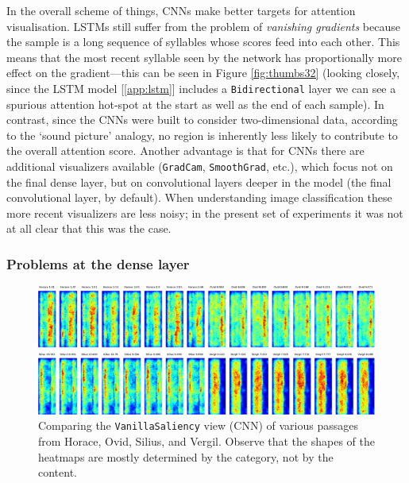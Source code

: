 \documentclass[
    twocolumn,
    hf,
]{ceurart}
\begin{document}
In the overall scheme of things, CNNs make better targets for attention
visualisation. LSTMs still suffer from the problem of \emph{vanishing gradients}
because the sample is a long sequence of syllables whose scores feed into each
other. This means that the most recent syllable seen by the network has
proportionally more effect on the gradient---this can be seen in Figure
\ref{fig:thumbs32} (looking closely, since the LSTM
model [\ref{app:lstm}] includes a \texttt{Bidirectional} layer we
can see a spurious attention hot-spot at the start as well as the end of each
sample). In contrast, since the CNNs were built to consider two-dimensional
data, according to the `sound picture' analogy, no region is inherently less
likely to contribute to the overall attention score. Another advantage is that
for CNNs there are additional visualizers available
(\texttt{GradCam}, \texttt{SmoothGrad}, etc.), which
focus not on the final dense layer, but on convolutional layers deeper in the
model (the final convolutional layer, by default). When understanding image
classification these more recent visualizers are less noisy; in the present set
of experiments it was not at all clear that this was the case.

\subsubsection{Problems at the dense layer}

\begin{figure}
    \includegraphics[width=\textwidth]{figures/hosv-vs-crop.pdf}
    \caption{Comparing the \texttt{VanillaSaliency} view (CNN) of
        various passages from Horace, Ovid, Silius, and Vergil. Observe that the
        shapes of the heatmaps are mostly determined by the category, not by the
        content.}
    \label{fig:hosv-vs}
\end{figure}
\end{document}
